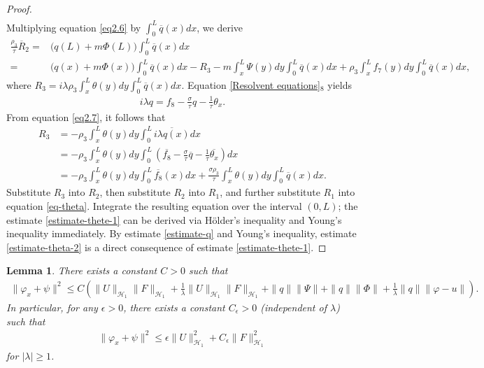 \documentclass[11pt,reqno]{article}
\newtheorem{lemma}[theorem]{Lemma}
\begin{document}
\begin{proof}
\begin{align}
  	\end{align}
  	Multiplying equation \eqref{eq2.6} by $\int_{0}^{L}\overline{q}(x)dx$, we derive
  	\begin{align*}
  		\frac{\rho_3}{\tau}\overline{R}_2 =& \big(q(L) + m\Phi(L)\big) \int_0^L \overline{q}(x) dx \\
  		=& \big(q(x) + m\Phi(x)\big) \int_0^L \overline{q}(x) dx - R_3 - m \int_x^L \Psi(y) dy \int_0^L \overline{q}(x) dx  + \rho_3 \int_x^L f_7(y) dy \int_0^L \overline{q}(x) dx,
  	\end{align*}
  	where $R_3=i\lambda\rho_3 \int_x^L \theta(y) dy \int_0^L \overline{q}(x) dx $. Equation \eqref{Resolvent equations}$_8$ yields
  	\begin{align}\label{eq2.7}
  		i\lambda q=f_8 - \frac{\sigma}{\tau}q - \frac{1}{\tau}\theta_x.
  	\end{align}
  	From equation \eqref{eq2.7}, it follows that
  	\begin{align*}
  		R_3 &= -\rho_3 \int_x^L \theta(y)  dy \int_0^L \overline{i\lambda q(x)}  dx \\
  		&= -\rho_3 \int_x^L \theta(y)  dy \int_0^L \left( \overline{f_8} - \frac{\sigma}{\tau}\overline{q} - \frac{1}{\tau} \overline{\theta_x} \right) dx \\
  		&= -\rho_3 \int_x^L \theta(y)  dy \int_0^L \overline{f_8}(x)  dx + \frac{\sigma \rho_3}{\tau} \int_x^L \theta(y)  dy \int_0^L \overline{q}(x)  dx.
  	\end{align*}
  	Substitute $R_3$ into $R_2$, then substitute $R_2$ into $R_1$, and further substitute $R_1$ into equation \eqref{eq-theta}. Integrate the resulting equation over the interval $(0, L)$; the estimate \eqref{estimate-thete-1} can be derived via H\"older's inequality and Young's inequality immediately. By estimate \eqref{estimate-q} and Young's inequality, estimate \eqref{estimate-theta-2} is a direct consequence of estimate \eqref{estimate-thete-1}.
  \end{proof}
  \begin{lemma}\label{lemma-varphix}
  	There exists a constant $C>0$ such that
  	\begin{align}\label{estimate-varphix-1}
  		\|\varphi_x + \psi\|^2 \leq C(\|U\|_{\mathcal{H}_1}\|F\|_{\mathcal{H}_1} + \frac{1}{\lambda}\|U\|_{\mathcal{H}_1}\|F\|_{\mathcal{H}_1} + \|q\|\|\Psi\| + \|q\|\|\Phi\| + \frac{1}{\lambda}\|q\|\|\varphi - u \|).
  	\end{align}
  	In particular, for any $\epsilon>0$, there exists a constant $C_{\epsilon}>0$ (independent of $\lambda$) such that
  	\begin{align}\label{estimate-varphix-2}
  		\|\varphi_x + \psi\|^2 \leq \epsilon\|U\|_{\mathcal{H}_1}^2 + C_{\epsilon}\|F\|_{\mathcal{H}_1}^2
  	\end{align}
  	for $|\lambda| \geq 1$.
  \end{lemma}
\end{document}
